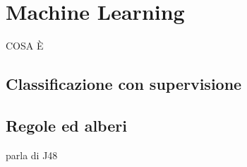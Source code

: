 \chapter{Machine Learning}
COSA È
\section{Classificazione con supervisione}
\section{Regole ed alberi} parla di J48